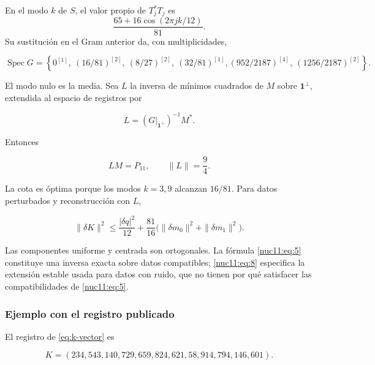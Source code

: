 En el modo \(k\) de \(S\), el valor propio de \(T_j^*T_j\) es
\[
 \frac{65+16\cos(2\pi jk/12)}{81}.
\]
Su sustitución en el Gram anterior da, con multiplicidades,



\begin{equation}
\operatorname{Spec}G=\left\{
0^{[1]},\ (16/81)^{[2]},\ (8/27)^{[2]},\ (32/81)^{[1]},
(952/2187)^{[4]},\ (1256/2187)^{[2]}\right\}.
\label{nuc11:eq:7}
\end{equation}



El modo nulo es la media. Sea \(L\) la inversa de mínimos cuadrados
de \(M\) sobre \(\mathbf1^\perp\), extendida al espacio de
registros por



\[
L=(G|_{\mathbf1^\perp})^{-1}M^*.
\]



Entonces



\begin{equation}
LM=P_{11},\qquad \|L\|=\frac94.
\label{nuc11:eq:8}
\end{equation}



La cota es óptima porque los modos \(k=3,9\) alcanzan \(16/81\).
Para datos perturbados y reconstrucción con \(L\),



\begin{equation}
\|\delta K\|^2\le \frac{|\delta q|^2}{12}
+\frac{81}{16}\bigl(\|\delta m_0\|^2+\|\delta m_1\|^2\bigr).
\label{nuc11:eq:9}
\end{equation}



Las componentes uniforme y centrada son ortogonales. La fórmula \eqref{nuc11:eq:5} constituye una inversa exacta sobre datos compatibles; \eqref{nuc11:eq:8} especifica la extensión estable usada para datos con ruido, que no tienen por qué satisfacer las compatibilidades de \eqref{nuc11:eq:5}.

\subsubsection{Ejemplo con el registro publicado}

El registro de \eqref{eq:k-vector} es



\begin{equation}
K=(234,543,140,729,659,824,621,58,914,794,146,601).
\label{nuc11:eq:10}
\end{equation}



